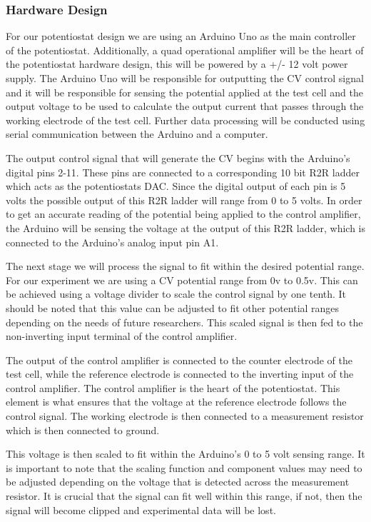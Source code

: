 \documentclass{article}
\begin{document}
\subsubsection*{Hardware Design}
For our potentiostat design we are using an Arduino Uno as the main controller of the potentiostat. Additionally, a quad operational amplifier will be the heart of the potentiostat hardware design, this will be powered by a +/- 12 volt power supply. The Arduino Uno will be responsible for outputting the CV control signal and it will be responsible for sensing the potential applied at the test cell and the output voltage to be used to calculate the output current that passes through the working electrode of the test cell. Further data processing will be conducted using serial communication between the Arduino and a computer.


The output control signal that will generate the CV begins with the Arduino's digital pins 2-11. These pins are connected to a corresponding 10 bit R2R ladder which acts as the potentiostats DAC. Since the digital output of each pin is 5 volts the possible output of this R2R ladder will range from 0 to 5 volts. In order to get an accurate reading of the potential being applied to the control amplifier, the Arduino will be sensing the voltage at the output of this R2R ladder, which is connected to the Arduino's analog input pin A1.


The next stage we will process the signal to fit within the desired potential range. For our experiment we are using a CV potential range from 0v to 0.5v. This can be achieved using a voltage divider to scale the control signal by one tenth. It should be noted that this value can be adjusted to fit other potential ranges depending on the needs of future researchers. This scaled signal is then fed to the non-inverting input terminal of the control amplifier.


The output of the control amplifier is connected to the counter electrode of the test cell, while the reference electrode is connected to the inverting input of the control amplifier. The control amplifier is the heart of the potentiostat. This element is what ensures that the voltage at the reference electrode follows the control signal. The working electrode is then connected to a measurement resistor which is then connected to ground.


This voltage is then scaled to fit within the Arduino's 0 to 5 volt sensing range. It is important to note that the scaling function and component values may need to be adjusted depending on the voltage that is detected across the measurement resistor. It is crucial that the signal can fit well within this range, if not, then the signal will become clipped and experimental data will be lost.
\end{document}
